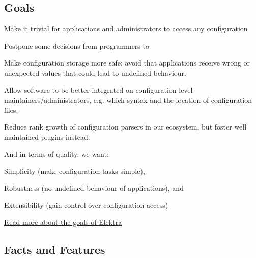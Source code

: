 \subsection*{Goals}


\begin{DoxyItemize}
\item Make it trivial for applications and administrators to access any configuration
\item Postpone some decisions from programmers to
\item Make configuration storage more safe\+: avoid that applications receive wrong or unexpected values that could lead to undefined behaviour.
\item Allow software to be better integrated on configuration level maintainers/administrators, e.\+g. which syntax and the location of configuration files.
\item Reduce rank growth of configuration parsers in our ecosystem, but foster well maintained plugins instead.
\end{DoxyItemize}

And in terms of quality, we want\+:


\begin{DoxyEnumerate}
\item Simplicity (make configuration tasks simple),
\item Robustness (no undefined behaviour of applications), and
\item Extensibility (gain control over configuration access)
\end{DoxyEnumerate}

\hyperlink{doc_GOALS_md}{Read more about the goals of Elektra}

\subsection*{Facts and Features}


